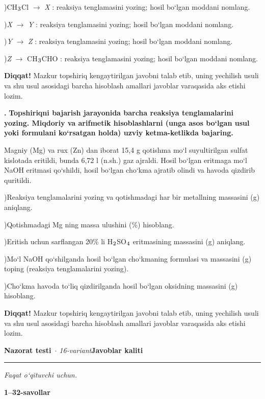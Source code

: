 \documentclass[11pt,a4paper]{article}
\renewcommand{\textsubscript}[1]{\ensuremath{_{\text{\fontsize{8}{8}\selectfont #1}}}}
\newcommand{\qn}[1]{\textbf{\fontsize{11.5}{13}\selectfont #1}}
\newcommand{\qsep}{\par\vspace{1pt}\noindent\rule{0pt}{0.4pt}\par\vspace{5pt}}
\newcommand{\diqqat}[1]{\par\smallskip\noindent\textbf{Diqqat!} #1\par\medskip}
\begin{document}
)CH\textsubscript{3}Cl $\to$ \textit{X} : reaksiya tenglamasini yozing; hosil bo`lgan moddani nomlang.\par
{})\textit{X} $\to$ \textit{Y} : reaksiya tenglamasini yozing; hosil bo`lgan moddani nomlang.\par
{})\textit{Y} $\to$ \textit{Z} : reaksiya tenglamasini yozing; hosil bo`lgan moddani nomlang.\par
{})\textit{Z} $\to$ CH\textsubscript{3}CHO : reaksiya tenglamasini yozing; hosil bo`lgan moddani nomlang.\par
\diqqat{Mazkur topshiriq kengaytirilgan javobni talab etib, uning yechilish usuli va shu usul asosidagi barcha hisoblash amallari javoblar varaqasida aks etishi lozim.}\qsep
\noindent\qn{43.} \textbf{Topshiriqni bajarish jarayonida barcha reaksiya tenglamalarini yozing. Miqdoriy va arifmetik hisoblashlarni (unga asos bo`lgan usul yoki formulani ko`rsatgan holda) uzviy ketma-ketlikda bajaring.}\par\smallskip
Magniy (Mg) va rux (Zn) dan iborat 15,4 g qotishma mo`l suyultirilgan sulfat kislotada eritildi, bunda 6,72 l (n.sh.) gaz ajraldi. Hosil bo`lgan eritmaga mo`l NaOH eritmasi qo`shildi, hosil bo`lgan cho`kma ajratib olindi va havoda qizdirib quritildi.\par
{})Reaksiya tenglamalarini yozing va qotishmadagi har bir metallning massasini (g) aniqlang.\par
{})Qotishmadagi Mg ning massa ulushini (\%) hisoblang.\par
{})Eritish uchun sarflangan 20\% li H\textsubscript{2}SO\textsubscript{4} eritmasining massasini (g) aniqlang.\par
{})Mo`l NaOH qo`shilganda hosil bo`lgan cho`kmaning formulasi va massasini (g) toping (reaksiya tenglamalarini yozing).\par
{})Cho`kma havoda to`liq qizdirilganda hosil bo`lgan oksidning massasini (g) hisoblang.\par
\diqqat{Mazkur topshiriq kengaytirilgan javobni talab etib, uning yechilish usuli va shu usul asosidagi barcha hisoblash amallari javoblar varaqasida aks etishi lozim.}\qsep
\newpage
\noindent\textbf{\fontsize{13}{15}\selectfont Nazorat testi}\ \textit{$\cdot$ 16-variant}\hfill \textbf{Javoblar kaliti}\par\smallskip\hrule\smallskip
\textit{Faqat o`qituvchi uchun.}\par\medskip
\noindent\textbf{1--32-savollar}\par\smallskip
\end{document}
